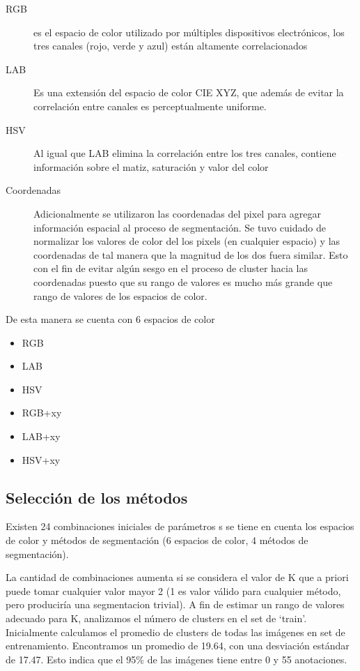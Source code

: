 \documentclass[10pt,twocolumn,letterpaper]{article}
\begin{document}
\begin{description}
\item[RGB] es el espacio de color utilizado por múltiples dispositivos electrónicos, los tres canales (rojo, verde y azul) están altamente correlacionados
\item[LAB] Es una extensión del espacio de color CIE XYZ, que además de evitar la correlación entre canales es perceptualmente uniforme.
\item[HSV] Al igual que LAB elimina la correlación entre los tres canales,  contiene información sobre el matiz, saturación y valor del color
\item[Coordenadas] Adicionalmente se utilizaron las coordenadas del pixel para agregar información espacial al proceso de segmentación.  Se tuvo cuidado de  normalizar los valores de color del los pixels (en cualquier espacio) y las coordenadas de tal manera que la magnitud de los dos fuera similar. Esto con el fin de evitar algún sesgo en el proceso de cluster hacia las coordenadas puesto que su rango de valores es mucho más grande que rango de valores de los espacios de color.
\end{description}
De esta manera se cuenta con 6 espacios de color

\begin{itemize}
\item RGB
\item LAB
\item HSV
\item RGB+xy
\item LAB+xy
\item HSV+xy
\end{itemize}


\subsection{Selección de los métodos}

Existen 24 combinaciones iniciales de parámetros s se tiene en cuenta los espacios de color y métodos de segmentación (6 espacios de color, 4 métodos de segmentación).

La cantidad de combinaciones aumenta si se considera  el valor de K que a priori puede tomar cualquier valor mayor 2 (1 es valor válido para cualquier método, pero produciría una segmentacion trivial). A fin de estimar un rango de valores adecuado para K, analizamos el número de clusters en el set de ‘train’. Inicialmente calculamos el promedio de clusters de todas las imágenes en set de entrenamiento. Encontramos un promedio de 19.64, con una desviación estándar de 17.47. Esto indica que el 95\% de las imágenes tiene entre 0 y 55 anotaciones. 
\end{document}
